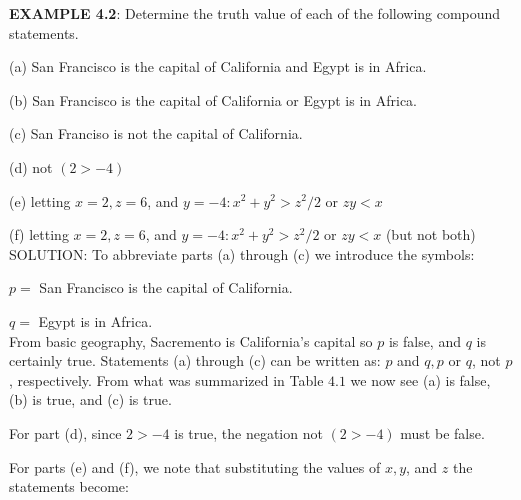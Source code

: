\documentclass[../main.tex]{subfiles}
\begin{document}

\textbf{EXAMPLE 4.2}: Determine the truth value of each of the following compound statements.

(a) San Francisco is the capital of California and Egypt is in Africa.

(b) San Francisco is the capital of California or Egypt is in Africa.

(c) San Franciso is not the capital of California.

(d) not $(2>-4)$

(e) letting $x=2, z=6$, and $y=-4: x^{2}+y^{2}>z^{2} / 2$ or $z y<x$

(f) letting $x=2, z=6$, and $y=-4: x^{2}+y^{2}>z^{2} / 2$ or $z y<x$ (but not both)\\

SOLUTION: To abbreviate parts (a) through (c) we introduce the symbols:

$p=$ San Francisco is the capital of California.

$q=$ Egypt is in Africa.\\

From basic geography, Sacremento is California's capital so $p$ is false, and $q$ is certainly true. Statements (a) through (c) can be written as: $p$ and $q, p$ or $q$, not $p$, respectively. From what was summarized in Table $4.1$ we now see (a) is false, (b) is true, and (c) is true.

For part (d), since $2>-4$ is true, the negation not $(2>-4)$ must be false.

For parts (e) and (f), we note that substituting the values of $x, y$, and $z$ the statements become:
\end{document}
